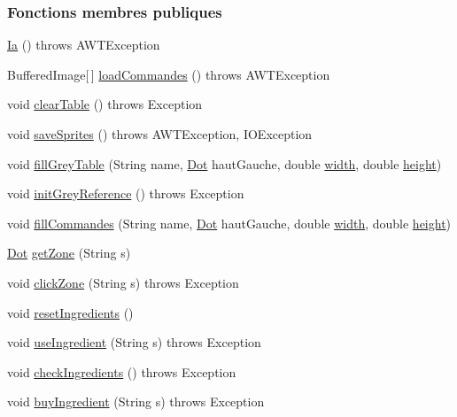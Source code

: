 \subsubsection*{Fonctions membres publiques}
\begin{DoxyCompactItemize}
\item 
\hyperlink{classSuchi_1_1Ia_a9c574fcd317f6c966660ab8d574c2512}{Ia} ()  throws A\+W\+T\+Exception 
\item 
Buffered\+Image\mbox{[}$\,$\mbox{]} \hyperlink{classSuchi_1_1Ia_a2559a253edf5da792054789e987916e2}{load\+Commandes} ()  throws A\+W\+T\+Exception 
\item 
void \hyperlink{classSuchi_1_1Ia_a4ed4989c340ab5093c939a3d2c57237b}{clear\+Table} ()  throws Exception 
\item 
void \hyperlink{classSuchi_1_1Ia_a547537305068065717526b2c851bcc95}{save\+Sprites} ()  throws A\+W\+T\+Exception, I\+O\+Exception 
\item 
void \hyperlink{classSuchi_1_1Ia_ab3a8439dc96e3510a8608653bb905f31}{fill\+Grey\+Table} (String name, \hyperlink{classSuchi_1_1Dot}{Dot} haut\+Gauche, double \hyperlink{classSuchi_1_1Ia_a12da02ac75078cffa5ab4f3562a6ee98}{width}, double \hyperlink{classSuchi_1_1Ia_af7ce6cad6d21a47c9c31559657a9f000}{height})
\item 
void \hyperlink{classSuchi_1_1Ia_aac06aa97debea740baf03ebaf7d55f5e}{init\+Grey\+Reference} ()  throws Exception 
\item 
void \hyperlink{classSuchi_1_1Ia_a587016dd202f4b315f396f6b2da3660b}{fill\+Commandes} (String name, \hyperlink{classSuchi_1_1Dot}{Dot} haut\+Gauche, double \hyperlink{classSuchi_1_1Ia_a12da02ac75078cffa5ab4f3562a6ee98}{width}, double \hyperlink{classSuchi_1_1Ia_af7ce6cad6d21a47c9c31559657a9f000}{height})
\item 
\hyperlink{classSuchi_1_1Dot}{Dot} \hyperlink{classSuchi_1_1Ia_a3f0bcdc109bbd488785f8c281aa251b7}{get\+Zone} (String s)
\item 
void \hyperlink{classSuchi_1_1Ia_a966d4dfabbbe88f5b797794f1b6b3c4e}{click\+Zone} (String s)  throws Exception 
\item 
void \hyperlink{classSuchi_1_1Ia_a0e55355d2f0ba08d1f7cbb4e30ed26af}{reset\+Ingredients} ()
\item 
void \hyperlink{classSuchi_1_1Ia_a2f66e140aa14567ba4aa99afc4a637b8}{use\+Ingredient} (String s)  throws Exception 
\item 
void \hyperlink{classSuchi_1_1Ia_a58609a5b202ad50445278555a445f2ef}{check\+Ingredients} ()  throws Exception 
\item 
void \hyperlink{classSuchi_1_1Ia_abaca0c75310f60e7d7d172b5c4b0606b}{buy\+Ingredient} (String s)  throws Exception 
\end{DoxyCompactItemize}
